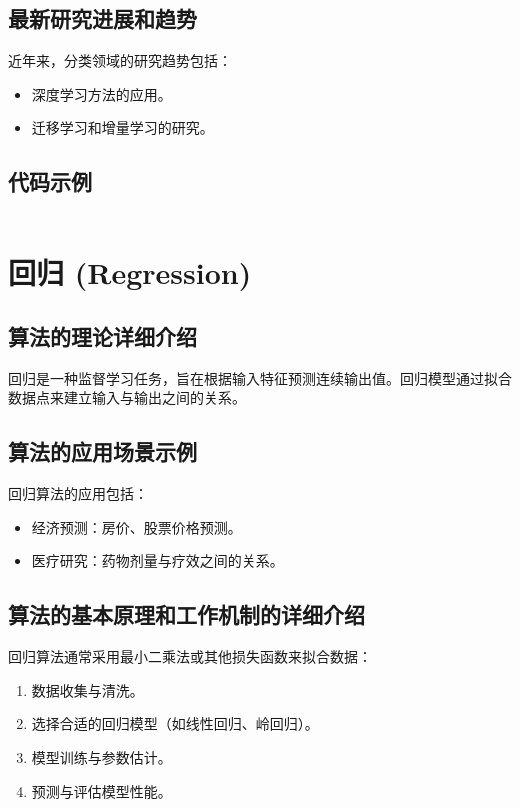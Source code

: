 \subsection*{最新研究进展和趋势}
近年来，分类领域的研究趋势包括：
\begin{itemize}
    \item 深度学习方法的应用。
    \item 迁移学习和增量学习的研究。
\end{itemize}
\subsection*{代码示例}
\begin{lstlisting}

\end{lstlisting}


\section{回归 (Regression)}
\subsection*{算法的理论详细介绍}
回归是一种监督学习任务，旨在根据输入特征预测连续输出值。回归模型通过拟合数据点来建立输入与输出之间的关系。

\subsection*{算法的应用场景示例}
回归算法的应用包括：
\begin{itemize}
    \item 经济预测：房价、股票价格预测。
    \item 医疗研究：药物剂量与疗效之间的关系。
\end{itemize}

\subsection*{算法的基本原理和工作机制的详细介绍}
回归算法通常采用最小二乘法或其他损失函数来拟合数据：
\begin{enumerate}
    \item 数据收集与清洗。
    \item 选择合适的回归模型（如线性回归、岭回归）。
    \item 模型训练与参数估计。
    \item 预测与评估模型性能。
\end{enumerate}

